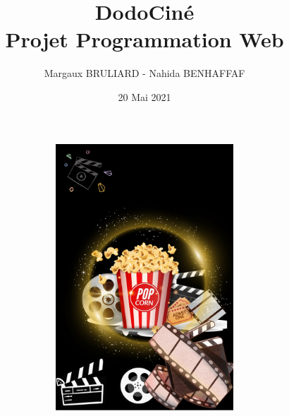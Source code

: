 \documentclass[a4paper, 11pt]{MyReport}
\author{Margaux BRULIARD - Nahida BENHAFFAF}
\title{DodoCiné \\ \vspace*{0.5cm}Projet Programmation Web}
\date{20 Mai 2021}
\begin{document}
	\begin{printTitle}
		\begin{figure}[!ht]
			\centering
			\includegraphics[width=15cm, height=10cm]{img/back.jpg}
		\end{figure}
	\end{printTitle}

	\tableofcontents
	\newpage

	

	

	
	
	


	

		
		


			

\end{document}
